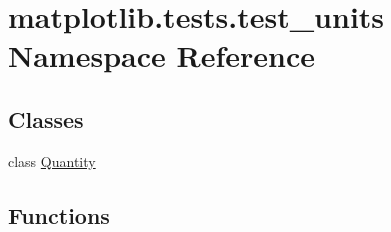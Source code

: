 \hypertarget{namespacematplotlib_1_1tests_1_1test__units}{}\section{matplotlib.\+tests.\+test\+\_\+units Namespace Reference}
\label{namespacematplotlib_1_1tests_1_1test__units}
\subsection*{Classes}
\begin{DoxyCompactItemize}
\item 
class \hyperlink{classmatplotlib_1_1tests_1_1test__units_1_1Quantity}{Quantity}
\end{DoxyCompactItemize}
\subsection*{Functions}
